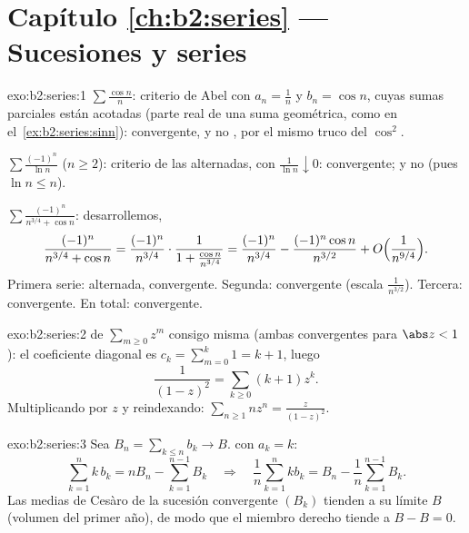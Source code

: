 \section*{Capítulo \ref{ch:b2:series} --- Sucesiones y series}

\begin{solution}{exo:b2:series:1}
$\sum\frac{\cos n}{n}$: criterio de Abel con $a_n = \frac1n$ y $b_n
= \cos n$, cuyas sumas parciales están acotadas (parte real de una
suma geométrica, como en el~\cref{ex:b2:series:sinn}): convergente,
y no , por el mismo truco del $\cos^2$.

$\sum \frac{(-1)^n}{\ln n}$ ($n \geq 2$): criterio de las
alternadas, con $\frac{1}{\ln n} \downarrow 0$: convergente; y no
 (pues $\ln n \leq n$).

$\sum \frac{(-1)^n}{n^{3/4} + \cos n}$: desarrollemos,
\[
\frac{(-1)^n}{n^{3/4} + \cos n}
= \frac{(-1)^n}{n^{3/4}}\cdot
\frac{1}{1 + \frac{\cos n}{n^{3/4}}}
= \frac{(-1)^n}{n^{3/4}}
- \frac{(-1)^n\cos n}{n^{3/2}} + O\Bigl(\frac{1}{n^{9/4}}\Bigr).
\]
Primera serie: alternada, convergente. Segunda: 
convergente (escala $\frac{1}{n^{3/2}}$). Tercera: 
convergente. En total: convergente.
\end{solution}

\begin{solution}{exo:b2:series:2}
 de $\sum_{m\geq0} z^m$ consigo misma (ambas
 convergentes para $\abs z < 1$): el coeficiente
diagonal es $c_k = \sum_{m=0}^{k} 1 = k + 1$, luego
\[
\frac{1}{(1-z)^2} = \sum_{k\geq0} (k+1)z^k .
\]
Multiplicando por $z$ y reindexando: $\sum_{n \geq 1} n z^n =
\frac{z}{(1-z)^2}$.
\end{solution}

\begin{solution}{exo:b2:series:3}
Sea $B_n = \sum_{k \leq n} b_k \to B$.  con $a_k =
k$:
\[
\sum_{k=1}^{n} k\,b_k = n B_n - \sum_{k=1}^{n-1} B_k
\quad\Longrightarrow\quad
\frac1n \sum_{k=1}^{n} k b_k = B_n - \frac{1}{n}\sum_{k=1}^{n-1}
B_k .
\]
Las medias de Cesàro de la sucesión convergente $(B_k)$ tienden a su
límite $B$ (volumen del primer año), de modo que el miembro derecho
tiende a $B - B = 0$.
\end{solution}

